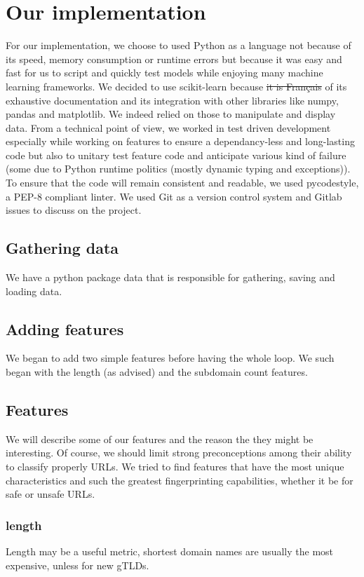 \documentclass[conference,11pt]{IEEEtran}
\begin{document}
\section{Our implementation}
For our implementation, we choose to used Python as a language not because of
its speed, memory consumption or runtime errors but because it was easy and fast
for us to script and quickly test models while enjoying many machine learning
frameworks. We decided to use scikit-learn because \sout{it is Français} of its
exhaustive documentation and its integration with other libraries like numpy,
pandas and matplotlib. We indeed relied on those to manipulate and display data.
From a technical point of view, we worked in test driven development especially
while working on features to ensure a dependancy-less and long-lasting code but
also to unitary test feature code and anticipate various kind of failure (some
due to Python runtime politics (mostly dynamic typing and exceptions)). To
ensure that the code will remain consistent and readable, we used pycodestyle, a
PEP-8 compliant linter. We used Git as a version control system and Gitlab
issues to discuss on the project.

\subsection{Gathering data}
We have a python package data that is responsible for gathering, saving and
loading data.

\subsection{Adding features}
We began to add two simple features before having the whole loop. We such began
with the length (as advised) and the subdomain count features.

\subsection{Features}
We will describe some of our features and the reason the they might be
interesting. Of course, we should limit strong preconceptions among their
ability to classify properly URLs. We tried to find features that have the most
unique characteristics and such the greatest fingerprinting capabilities,
whether it be for safe or unsafe URLs.

\subsubsection{length}
Length may be a useful metric, shortest domain names are usually the most
expensive, unless for new gTLDs.
\end{document}
